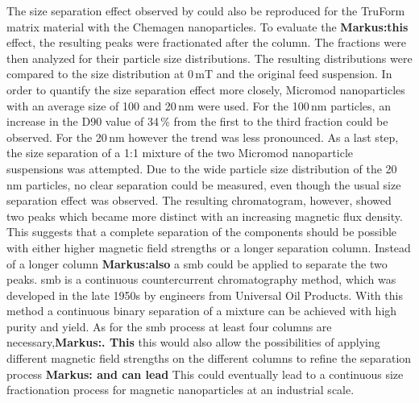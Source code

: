 The size separation effect observed by \cite{AndreMaster} could also be reproduced for the TruForm matrix material with the Chemagen nanoparticles. To evaluate the \textbf{Markus:this} effect, the resulting peaks were fractionated after the column. The fractions were then analyzed for their particle size distributions. The resulting distributions were compared to the size distribution at 0\,mT and the original feed suspension. In order to quantify the size separation effect more closely, Micromod nanoparticles with an average size of 100 and 20\,nm were used. For the 100\,nm particles, an increase in the D90 value of 34\,\% from the first to the third fraction could be observed. For the 20\,nm however the trend was less pronounced. As a last step, the size separation of a 1:1 mixture of the two Micromod nanoparticle suspensions was attempted. Due to the wide particle size distribution of the 20\,nm particles, no clear separation could be measured, even though the usual size separation effect was observed. The resulting chromatogram, however, showed two peaks which became more distinct with an increasing magnetic flux density. This suggests that a complete separation of the components should be possible with either higher magnetic field strengths or a longer separation column. Instead of a longer column \textbf{Markus:also} a \gls{smb} could be applied to separate the two peaks. \Gls{smb} is a continuous countercurrent chromatography method, which was developed in the late 1950s by engineers from Universal Oil Products\cite{broughton1961continuous,carson1962rotary}. With this method a continuous binary separation of a mixture can be achieved with high purity and yield. As for the \gls{smb} process at least four columns are necessary,\textbf{Markus:. This} this would also allow the possibilities of applying different magnetic field strengths on the different columns to refine the separation process \textbf{Markus: and can lead} This could eventually lead to a continuous size fractionation process for magnetic nanoparticles at an industrial scale.  